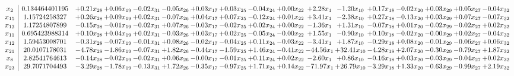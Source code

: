 \documentclass[9pt]{article}
\begin{document}
 \[\begin{array}{c| c c@{\hskip 2pt} c@{\hskip 2pt} c@{\hskip 2pt} c@{\hskip 2pt} c@{\hskip 2pt} c@{\hskip 2pt} c@{\hskip 2pt} c@{\hskip 2pt} c@{\hskip 2pt} c@{\hskip 2pt} c@{\hskip 2pt} c@{\hskip 2pt} c@{\hskip 2pt} c@{\hskip 2pt} c@{\hskip 2pt} }
 x_{2}   &  0.134464401195 & +  0.21 x_{28} & +  0.06 x_{19} & -0.02 x_{31} & -0.05 x_{26} & +  0.03 x_{17} & +  0.03 x_{25} & -0.04 x_{24} & +  0.00 x_{22} & +  2.28 x_{1} & -1.20 x_{10} & +  0.17 x_{18} & -0.02 x_{20} & +  0.03 x_{29} & +  0.05 x_{27} & -0.04 x_{32}\\
 x_{15}   &  1.15724258327 & +  0.26 x_{28} & +  0.09 x_{19} & +  0.02 x_{31} & -0.07 x_{26} & +  0.04 x_{17} & +  0.07 x_{25} & -0.12 x_{24} & +  0.01 x_{22} & +  3.41 x_{1} & -2.38 x_{10} & +  0.27 x_{18} & -0.13 x_{20} & +  0.03 x_{29} & +  0.07 x_{27} & -0.07 x_{32}\\
 x_{13}   &  1.17254807899 & -0.15 x_{28} & -0.01 x_{19} & -0.02 x_{31} & +  0.07 x_{26} & -0.03 x_{17} & -0.02 x_{25} & +  0.02 x_{24} & +  0.00 x_{22} & -1.36 x_{1} & +  1.31 x_{10} & -0.07 x_{18} & +  0.01 x_{20} & -0.02 x_{29} & -0.02 x_{27} & +  0.02 x_{32}\\
 x_{11}   &  0.695423988314 & +  0.10 x_{28} & +  0.04 x_{19} & +  0.02 x_{31} & -0.03 x_{26} & +  0.03 x_{17} & +  0.02 x_{25} & -0.05 x_{24} & -0.00 x_{22} & +  1.55 x_{1} & -0.90 x_{10} & +  0.10 x_{18} & -0.02 x_{20} & -0.00 x_{29} & +  0.02 x_{27} & -0.04 x_{32}\\
 x_{12}   &  1.59453008701 & -0.31 x_{28} & -0.07 x_{19} & -0.01 x_{31} & +  0.08 x_{26} & -0.02 x_{17} & -0.04 x_{25} & +  0.11 x_{24} & -0.03 x_{22} & -3.41 x_{1} & +  1.87 x_{10} & -0.29 x_{18} & +  0.08 x_{20} & -0.01 x_{29} & -0.06 x_{27} & +  0.06 x_{32}\\
 x_{21}   &  20.0107178031 & -4.78 x_{28} & -1.86 x_{19} & -0.07 x_{31} & +  1.82 x_{26} & -0.44 x_{17} & -1.59 x_{25} & +  1.46 x_{24} & -0.41 x_{22} & -44.56 x_{1} & + 32.41 x_{10} & -4.28 x_{18} & +  2.07 x_{20} & -0.30 x_{29} & -0.79 x_{27} & +  1.87 x_{32}\\
 x_{8}   &  2.82541764613 & -0.14 x_{28} & -0.02 x_{19} & -0.02 x_{31} & +  0.06 x_{26} & -0.00 x_{17} & -0.01 x_{25} & +  0.11 x_{24} & +  0.02 x_{22} & -2.60 x_{1} & +  0.86 x_{10} & -0.16 x_{18} & +  0.03 x_{20} & -0.03 x_{29} & -0.04 x_{27} & +  0.02 x_{32}\\
 x_{23}   &  29.7071704493 & -3.29 x_{28} & -1.78 x_{19} & -0.13 x_{31} & +  1.72 x_{26} & -0.35 x_{17} & -0.97 x_{25} & +  1.71 x_{24} & +  0.14 x_{22} & -71.97 x_{1} & + 26.79 x_{10} & -3.29 x_{18} & +  1.33 x_{20} & -0.63 x_{29} & -0.99 x_{27} & +  2.19 x_{32}\\

\end{array}\]
\end{document}
